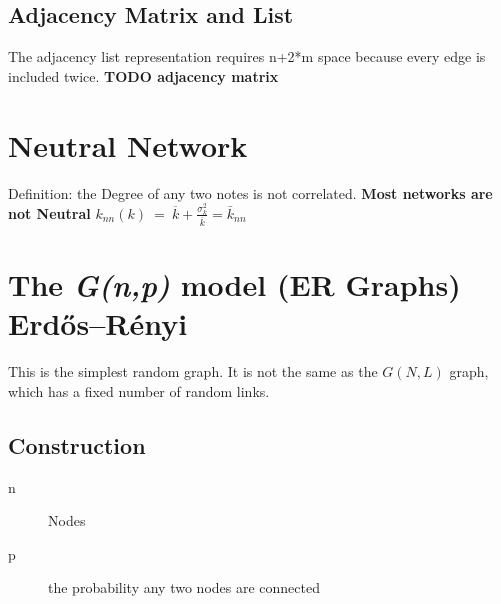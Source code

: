 \documentclass{article}
\begin{document}
\subsection{Adjacency Matrix and List}
The adjacency list representation requires n+2*m space because every edge is included twice. 
\textbf{TODO adjacency matrix}
\newpage
\section{Neutral Network}
Definition: the Degree of any two notes is not correlated.
\textbf{Most networks are not Neutral}
$k_{nn}(k)\:=\:\overline{k}+\frac{\sigma_k^2}{\overline{k}}=\bar{k}_{nn}$
\newpage
\section{The \textit{G(n,p)} model (ER Graphs) Erdős–Rényi}
This is the simplest random graph. It is not the same as the $G(N,L)$ graph, which has a fixed number of random links.
\subsection{Construction}
\begin{description}
    \item [n] Nodes
    \item [p] the probability any two nodes are connected 
\end{description}
\end{document}
